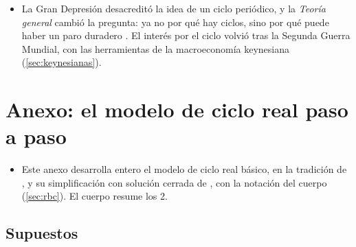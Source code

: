 \documentclass[11pt]{article}
\begin{document}
\begin{itemize}
\begin{itemize}
  \item \emph{monetarias}: el crédito de los intermediarios de  (1913) y el tipo de los bancos por debajo del natural de los austriacos\nocite{Mises1912Theorie,Hayek1931Prices};
  \item \emph{del subconsumo}: la demanda no alcanza a la producción (, 1910;  y , 1928);
  \item \emph{de las perturbaciones}: \textcite{Frisch1933Propagation} y \textcite{Slutsky1937Summation} (\ref{sec:edad-dorada}).
  \end{itemize}
\item La Gran Depresión desacreditó la idea de un ciclo periódico, y la \emph{Teoría general} cambió la pregunta: ya no por qué hay ciclos, sino por qué puede haber un paro duradero . El interés por el ciclo volvió tras la Segunda Guerra Mundial, con las herramientas de la macroeconomía keynesiana (\ref{sec:keynesianas}).
\end{itemize}

\section{Anexo: el modelo de ciclo real paso a paso}\label{anexo:rbc}

\begin{itemize}
\item Este anexo desarrolla entero el modelo de ciclo real básico, en la tradición de \textcite{KydlandPrescott1982Time}, y su simplificación con solución cerrada de \textcite{McCallum1989Real}, con la notación del cuerpo (\ref{sec:rbc}). El cuerpo resume los 2.
\end{itemize}

\subsection{Supuestos}
\end{document}
